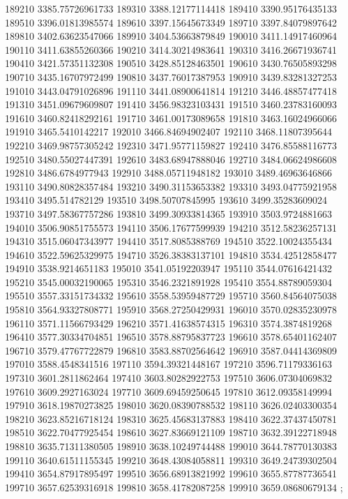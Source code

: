 {189210 3385.75726961733
189310 3388.12177114418
189410 3390.95176435133
189510 3396.01813985574
189610 3397.15645673349
189710 3397.84079897642
189810 3402.63623547066
189910 3404.53663879849
190010 3411.14917460964
190110 3411.63855260366
190210 3414.30214983641
190310 3416.26671936741
190410 3421.57351132308
190510 3428.85128463501
190610 3430.76505893298
190710 3435.16707972499
190810 3437.76017387953
190910 3439.83281327253
191010 3443.04791026896
191110 3441.08900641814
191210 3446.48857477418
191310 3451.09679609807
191410 3456.98323103431
191510 3460.23783160093
191610 3460.82418292161
191710 3461.00173089658
191810 3463.16024966066
191910 3465.5410142217
192010 3466.84694902407
192110 3468.11807395644
192210 3469.98757305242
192310 3471.95771159827
192410 3476.85588116773
192510 3480.55027447391
192610 3483.68947888046
192710 3484.06624986608
192810 3486.6784977943
192910 3488.05711948182
193010 3489.46963646866
193110 3490.80828357484
193210 3490.31153653382
193310 3493.04775921958
193410 3495.514782129
193510 3498.50707845995
193610 3499.35283609024
193710 3497.58367757286
193810 3499.30933814365
193910 3503.9724881663
194010 3506.90851755573
194110 3506.17677599939
194210 3512.58236257131
194310 3515.06047343977
194410 3517.8085388769
194510 3522.10024355434
194610 3522.59625329975
194710 3526.38383137101
194810 3534.42512858477
194910 3538.9214651183
195010 3541.05192203947
195110 3544.07616421432
195210 3545.00032190065
195310 3546.2321891928
195410 3554.88789059304
195510 3557.33151734332
195610 3558.53959487729
195710 3560.84564075038
195810 3564.93327808771
195910 3568.27250429931
196010 3570.02835230978
196110 3571.11566793429
196210 3571.41638574315
196310 3574.3874819268
196410 3577.30334704851
196510 3578.88795837723
196610 3578.65401162407
196710 3579.47767722879
196810 3583.88702564642
196910 3587.04414369809
197010 3588.4548341516
197110 3594.39321448167
197210 3596.71179336163
197310 3601.2811862464
197410 3603.80282922753
197510 3606.07304069832
197610 3609.2927163024
197710 3609.69459250645
197810 3612.09358149994
197910 3618.19870273825
198010 3620.08390788532
198110 3626.02403300354
198210 3623.85216718124
198310 3625.45683137883
198410 3622.37437450781
198510 3622.70477925454
198610 3627.83669121109
198710 3632.39122718948
198810 3635.71311380505
198910 3638.10249744488
199010 3644.78770130383
199110 3640.61511155345
199210 3648.43084058811
199310 3649.24739302504
199410 3654.87917895497
199510 3656.68913821992
199610 3655.87787736541
199710 3657.62539316918
199810 3658.41782087258
199910 3659.08680679134
};
